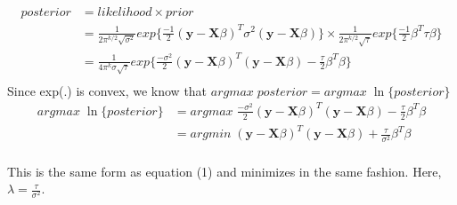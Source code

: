 \begin{align*}
    posterior &= likelihood \times prior \\
    &= \frac{1}{2\pi^{k/2}\sqrt{\sigma^2}}exp\{\frac{-1}{2}(\mathbf{y}-\mathbf{X}\beta)^T\sigma^2(\mathbf{y}-\mathbf{X}\beta)\} \times \frac{1}{2\pi^{k/2}\sqrt{\tau}}exp\{\frac{-1}{2}\beta^T\tau\beta\} \\
    &= \frac{1}{4\pi^k\sigma\sqrt{\tau}}exp\{\frac{-\sigma^2}{2}(\mathbf{y}-\mathbf{X}\beta)^T(\mathbf{y}-\mathbf{X}\beta) - \frac{\tau}{2}\beta^T\beta\} \\
\end{align*}
Since exp(.) is convex, we know that $argmax\; posterior = argmax\; \ln\{posterior\}$
\begin{align*}
    argmax\; \ln\{posterior\} &= argmax\; \frac{-\sigma^2}{2}(\mathbf{y}-\mathbf{X}\beta)^T(\mathbf{y}-\mathbf{X}\beta) - \frac{\tau}{2}\beta^T\beta \\
    &= argmin\; (\mathbf{y}-\mathbf{X}\beta)^T(\mathbf{y}-\mathbf{X}\beta) + \frac{\tau}{\sigma^2}\beta^T\beta \\
\end{align*}

This is the same form as equation (1) and minimizes in the same fashion. Here, $\lambda = \frac{\tau}{\sigma^2}$.